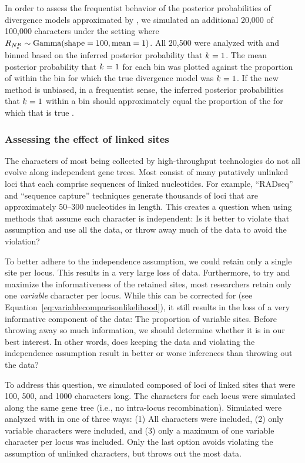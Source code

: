 In order to assess the frequentist behavior of the posterior probabilities of
divergence models approximated by \ecoevolity, we simulated an additional
20,000 \datasets of 100,000 characters under the setting where
$R_{N_{e}^{R{}}} \sim \textrm{Gamma}(\textrm{shape} = 100, \textrm{mean} = 1)$.
All 20,500 \datasets were analyzed with \ecoevolity and binned based on the
inferred posterior probability that $k_{}{} = 1$.
The mean posterior probability that $k_{}{} = 1$ for each bin was plotted
against the proportion of \datasets within the bin for which the true
divergence model was $k_{}{} = 1$.
If the new method is unbiased, in a frequentist sense, the inferred posterior
probabilities that $k_{}{} = 1$ within a bin should approximately equal the
proportion of the \datasets for which that is true
\citep{Huelsenbeck2004,Oaks2012,Oaks2014dpp}.

\subsubsection{Assessing the effect of linked sites}
The characters of most \datasets being collected by high-throughput technologies
do not all evolve along independent gene trees.
Most consist of many putatively unlinked loci that each comprise sequences of
linked nucleotides.
For example, ``RADseq'' and ``sequence capture'' techniques generate thousands
of loci that are approximately 50--300 nucleotides in length.
This creates a question when using methods that assume each character is
independent:
Is it better to violate that assumption and use all the data, or throw
away much of the data to avoid the violation?

To better adhere to the independence assumption, we could retain only a single
site per locus.
This results in a very large loss of data.
Furthermore, to try and maximize the informativeness of the retained sites,
most researchers retain only one \emph{variable} character per locus.
While this can be corrected for (see
Equation~\ref{eq:variablecomparisonlikelihood}), it still results in the loss
of a very informative component of the data: The proportion of variable sites.
Before throwing away so much information, we should determine whether
it is in our best interest.
In other words, does keeping the data and violating the independence
assumption result in better or worse inferences than throwing out the 
data?

To address this question, 
we simulated \datasets composed of loci of linked sites that were 100, 500, and
1000 characters long.
The characters for each locus were simulated along the same gene tree (i.e., no
intra-locus recombination).
Simulated \datasets were analyzed with \ecoevolity in one of three ways:
(1) All characters were included,
(2) only variable characters were included,
and
(3) only a maximum of one variable character per locus was included.
Only the last option avoids violating the assumption of unlinked characters,
but throws out the most data.


